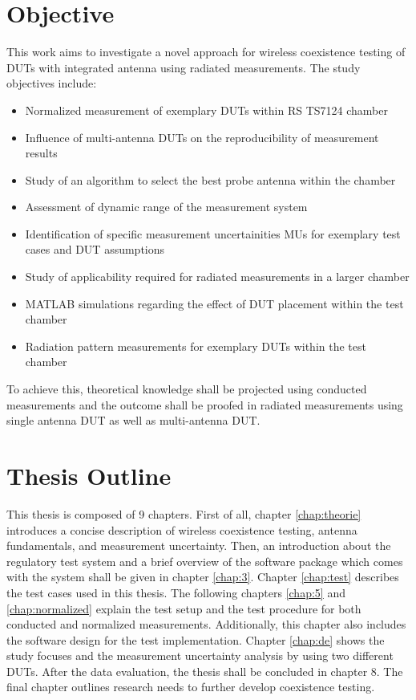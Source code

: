 \section{Objective}
This work aims to investigate a novel approach for wireless coexistence testing of \acsp{DUT} with integrated antenna using radiated measurements. The study objectives include:
\begin{itemize}
\item Normalized measurement of exemplary \acsp{DUT} within \ac{RS} TS7124 chamber
\item Influence of multi-antenna \acsp{DUT} on the reproducibility of measurement results
\item Study of an algorithm to select the best probe antenna within the chamber
\item Assessment of dynamic range of the measurement system
\item Identification of specific measurement uncertainities \acsp{MU} for exemplary test cases and \acs{DUT} assumptions
\item Study of applicability required for radiated measurements in a larger chamber
\item MATLAB simulations regarding the effect of \acs{DUT} placement within the test chamber
\item Radiation pattern measurements for exemplary \acsp{DUT} within the test chamber
\end{itemize}
To achieve this, theoretical knowledge shall be projected using conducted measurements and the outcome shall be proofed in radiated measurements using single antenna \acs{DUT} as well as multi-antenna \acs{DUT}. 

\section{Thesis Outline}
This thesis is composed of 9 chapters. First of all, chapter \ref{chap:theorie} introduces a concise description of wireless coexistence testing, antenna fundamentals, and measurement uncertainty. Then, an introduction about the regulatory test system and a brief overview of the software package which comes with the system shall be given in chapter \ref{chap:3}. Chapter  \ref{chap:test} describes the test cases used in this thesis. The following chapters  \ref{chap:5} and  \ref{chap:normalized} explain the test setup and the test procedure for both conducted and normalized measurements. Additionally, this chapter also includes the software design for the test implementation. Chapter \ref{chap:de} shows the study focuses and the measurement uncertainty analysis by using two different \acsp{DUT}. After the data evaluation, the thesis shall be concluded in chapter 8. The final chapter outlines research needs to further develop coexistence testing.











